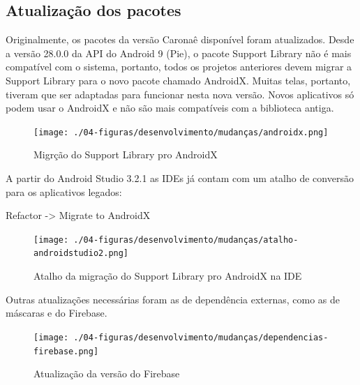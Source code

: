 \subsection{Atualização dos pacotes}
Originalmente, os pacotes da versão Caronaê disponível foram atualizados. Desde a versão 28.0.0 da API do Android 9 (Pie), o pacote Support Library não é mais compatível com o sistema, portanto, todos os projetos anteriores devem migrar a Support Library para o novo pacote chamado AndroidX. Muitas telas, portanto, tiveram que ser adaptadas para funcionar nesta nova versão. Novos aplicativos só podem usar o AndroidX e não são mais compatíveis com a biblioteca antiga.

\begin{figure}[!hbtp]
	\centering
	\caption{Migrção do Support Library pro AndroidX}
	\texttt{[image: ./04-figuras/desenvolvimento/mudanças/androidx.png]}
	\label{fig:1}
\end{figure}
	
A partir do Android Studio 3.2.1 as IDEs já contam com um atalho de conversão para os aplicativos legados:

Refactor -> Migrate to AndroidX

\begin{figure}[!hbtp]
	\centering
	\caption{Atalho da migração do Support Library pro AndroidX na IDE}
	\texttt{[image: ./04-figuras/desenvolvimento/mudanças/atalho-androidstudio2.png]}
	\label{fig:2}
\end{figure}

Outras atualizações necessárias foram as de dependência externas, como as de máscaras e do Firebase.

\begin{figure}[!hbtp]
	\centering
	\caption{Atualização da versão do Firebase}
	\texttt{[image: ./04-figuras/desenvolvimento/mudanças/dependencias-firebase.png]}
	\label{fig:7}
\end{figure}

